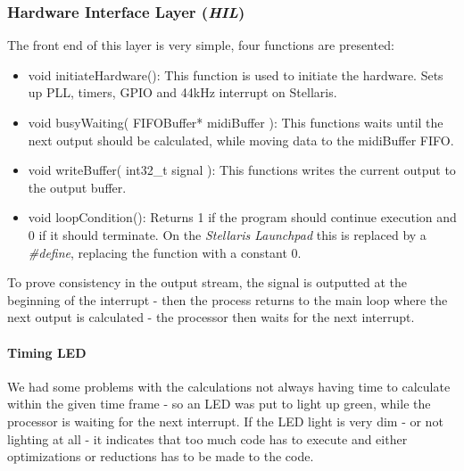 \subsubsection{Hardware Interface Layer (\emph{HIL})}
The front end of this layer is very simple, four functions are presented:
\begin{itemize}
  \item void initiateHardware(): This function is used to initiate the hardware.
  Sets up PLL, timers, GPIO and 44kHz interrupt on Stellaris.
  \item void busyWaiting( FIFOBuffer* midiBuffer ): This functions waits until
  the next output should be calculated, while moving data to the midiBuffer
  FIFO.
  \item void writeBuffer( int32\_t signal ): This functions writes the current
  output to the output buffer.
  \item void loopCondition(): Returns 1 if the program should continue execution
  and 0 if it should terminate. On the \emph{Stellaris Launchpad} this is
  replaced by a \emph{\#define}, replacing the function with a constant 0.
\end{itemize}

To prove consistency in the output stream, the signal is outputted at the
beginning of the interrupt - then the process returns to the main loop where the
next output is calculated - the processor then waits for the next interrupt.

\paragraph{Timing LED}
We had some problems with the calculations not always having time to calculate
within the given time frame - so an LED was put to light up green, while the
processor is waiting for the next interrupt. If the LED light is very dim - or
not lighting at all - it indicates that too much code has to execute and either
optimizations or reductions has to be made to the code.

